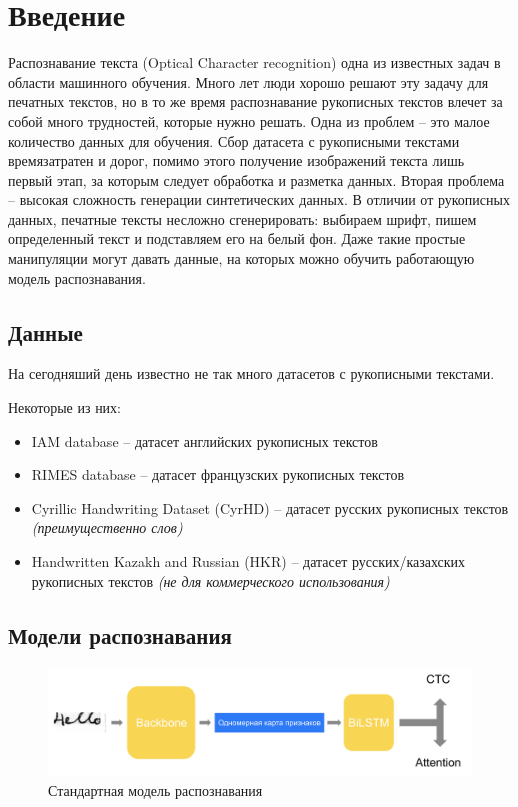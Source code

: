 \documentclass[12pt]{article}
\begin{document}
\tableofcontents

\newpage

\section{Введение}
Распознавание текста (Optical Character recognition) одна из известных задач в области машинного обучения.
Много лет люди хорошо решают эту задачу для печатных текстов, но в то же время распознавание рукописных текстов
влечет за собой много трудностей, которые нужно решать.
Одна из проблем -- это малое количество данных для обучения. Сбор датасета с рукописными текстами
времязатратен и дорог, помимо этого получение изображений текста  лишь первый этап, за которым следует обработка и разметка данных.
Вторая проблема -- высокая сложность генерации синтетических данных. В отличии от рукописных данных,
печатные тексты несложно сгенерировать: выбираем шрифт, пишем определенный текст и подставляем его на белый фон. Даже такие простые
манипуляции могут давать данные, на которых можно обучить работающую модель распознавания.

\subsection{Данные}
На сегодняший день известно не так много датасетов с рукописными текстами. 

\vspace{10pt}

Некоторые из них:
\begin{itemize}
    \item IAM database \cite{iam} -- датасет английских рукописных текстов
    \item RIMES database -- датасет французских рукописных текстов
    \item Cyrillic Handwriting Dataset (CyrHD)  \cite{chd} -- датасет русских рукописных текстов \textit{(преимущественно слов)}
    \item Handwritten Kazakh and Russian (HKR)  \cite{hkr} -- датасет русских/казахских рукописных текстов \textit{(не для коммерческого использования)}
\end{itemize}


\subsection{Модели распознавания}

\begin{figure}[htb]
    \centering
    \includegraphics[width=\linewidth]{recognition.png}
    \caption{Стандартная модель распознавания}
    \label{standard_recognizer}
\end{figure}
\end{document}
